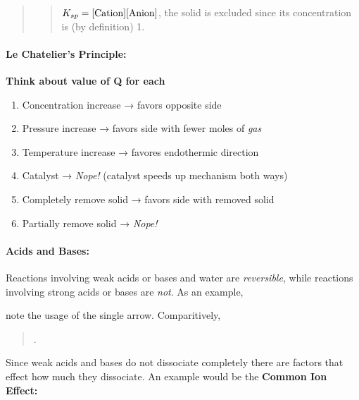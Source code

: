 \documentclass[]{article}
\providecommand{\tightlist}{%
  \setlength{\itemsep}{0pt}\setlength{\parskip}{0pt}}
\let\oldparagraph\paragraph
\renewcommand{\paragraph}[1]{\oldparagraph{#1}\mbox{}}
\begin{document}
\begin{quote}
\begin{quote}
\(K_{sp}=\text{\lbrack Cation\rbrack \lbrack Anion\rbrack }\), the solid
is excluded since its concentration is (by definition) 1.
\end{quote}
\end{quote}

\paragraph{Le Chatelier's Principle:}\label{le-chateliers-principle}

\textbf{Think about value of Q for each}

\begin{enumerate}
\def\labelenumi{\arabic{enumi}.}
\tightlist
\item
  Concentration increase → favors opposite side
\item
  Pressure increase → favors side with fewer moles of \emph{gas}
\item
  Temperature increase → favores endothermic direction
\item
  Catalyst → \emph{Nope!} (catalyst speeds up mechanism both ways)
\item
  Completely remove solid → favors side with removed solid
\item
  Partially remove solid → \emph{Nope!}
\end{enumerate}

\newpage 

\paragraph{Acids and Bases:}\label{acids-and-bases}

Reactions involving weak acids or bases and water are \emph{reversible},
while reactions involving strong acids or bases are \emph{not}. As an
example,

\begin{quote}
\end{quote}

note the usage of the single arrow. Comparitively,

\begin{quote}
.
\end{quote}

Since weak acids and bases do not dissociate completely there are
factors that effect how much they dissociate. An example would be the
\textbf{Common Ion Effect:}
\end{document}
